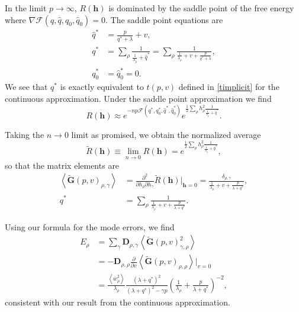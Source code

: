 \documentclass{article}
\begin{document}
In the limit $p \to \infty$, $R(\mathbf{h})$ is dominated by the saddle point of the free energy where $\nabla \mathcal{F}(q,\hat{q},q_0,\hat{q}_0) = 0$. The saddle point equations are
\begin{align}
    \hat{q}^* &= \frac{p}{q^*+\lambda} + v, \nonumber
    \\
    q^* &= \sum_\rho \frac{1}{\frac{1}{\lambda_\rho}+\hat{q}^*} = \sum_\rho \frac{1}{\frac{1}{\lambda_\rho} + v + \frac{p}{q^*+\lambda}},\nonumber
    \\
    q_0^* &= \hat{q}_0^* = 0.
\end{align}
%
We see that $q^*$ is exactly equivalent to $t(p,v)$ defined in \ref{timplicit} for the continuous approximation. Under the saddle point approximation we find
\begin{equation}
    R(\mathbf{h}) \approx e^{-n p \mathcal{F}(q^*,q_0^*,\hat{q}^*, \hat{q}_0^*)} e^{\frac{1}{2} \sum_\rho h_\rho^2\frac{1}{\frac{1}{\lambda_\rho} + \hat{q}^*}}. 
\end{equation}

Taking the $n \to 0$ limit as promised, we obtain the normalized average 
\begin{equation}
    \tilde{R}(\mathbf{h}) \equiv \lim_{n \to 0} R(\mathbf{h}) = e^{\frac{1}{2} \sum_\rho h_\rho^2\frac{1}{\frac{1}{\lambda_\rho} + \hat{q}^*}},
\end{equation}
so that the matrix elements are
\begin{align}
    \left< \mathbf{\tilde{G}}(p,v)_{\rho,\gamma}\right> &= \frac{\partial^2}{\partial h_\rho \partial h_\gamma} \tilde{R}(\mathbf{h})|_{\mathbf{h}=0}= \frac{\delta_{\rho,\gamma}}{\frac{1}{\lambda_\rho} + v+ \frac{p}{\lambda+q^*}},\nonumber
    \\
    q^* &= \sum_\rho \frac{1}{\frac{1}{\lambda_\rho}+v + \frac{p}{\lambda+q^*}}.
\end{align}

Using our formula for the mode errors, we find
\begin{align}
\nonumber
    E_\rho &= \sum_{\gamma} \mathbf{D}_{\rho,\gamma} \left< \mathbf{\tilde{G}}(p,v)_{\gamma,\rho}^2 \right> 
    \\
    \nonumber
    &= - \mathbf{D}_{\rho,\rho} \frac{\partial}{\partial v} \left< \mathbf{\tilde{G}}(p,v)_{\rho,\rho} \right>|_{v=0}
    \\
    &= \frac{\left< \overline{w}_\rho^2 \right>}{\lambda_\rho} \frac{ (\lambda+q^*)^2}{(\lambda+q^*)^2-\gamma p}  \left( \frac{1}{\lambda_\rho} + \frac{p}{\lambda+q^*} \right)^{-2},
\end{align}
%
consistent with our result from the continuous approximation.
\end{document}

